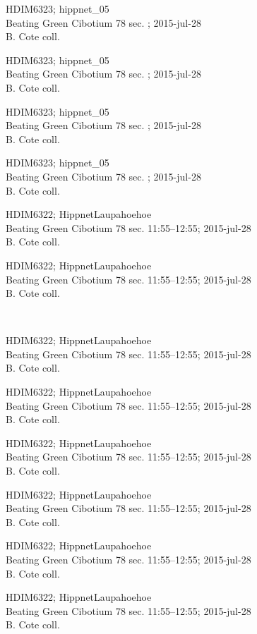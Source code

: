 \documentclass[2pt]{extarticle}
\begin{document}
\noindent
\parbox{0.16\textwidth}{\tiny \raggedright \rule[-0.3\baselineskip]{0pt}{10pt}HDIM6323; hippnet\_05\\ Beating Green Cibotium 78 sec. ; 2015-jul-28\\ B. Cote coll.}
\parbox{0.16\textwidth}{\tiny \raggedright \rule[-0.3\baselineskip]{0pt}{10pt}HDIM6323; hippnet\_05\\ Beating Green Cibotium 78 sec. ; 2015-jul-28\\ B. Cote coll.}
\parbox{0.16\textwidth}{\tiny \raggedright \rule[-0.3\baselineskip]{0pt}{10pt}HDIM6323; hippnet\_05\\ Beating Green Cibotium 78 sec. ; 2015-jul-28\\ B. Cote coll.}
\parbox{0.16\textwidth}{\tiny \raggedright \rule[-0.3\baselineskip]{0pt}{10pt}HDIM6323; hippnet\_05\\ Beating Green Cibotium 78 sec. ; 2015-jul-28\\ B. Cote coll.}
\parbox{0.16\textwidth}{\tiny \raggedright \rule[-0.3\baselineskip]{0pt}{10pt}HDIM6322; HippnetLaupahoehoe\\ Beating Green Cibotium 78 sec. 11:55--12:55; 2015-jul-28\\ B. Cote coll.}
\parbox{0.16\textwidth}{\tiny \raggedright \rule[-0.3\baselineskip]{0pt}{10pt}HDIM6322; HippnetLaupahoehoe\\ Beating Green Cibotium 78 sec. 11:55--12:55; 2015-jul-28\\ B. Cote coll.} \\ 
\vspace{0.001in} 

\noindent
\parbox{0.16\textwidth}{\tiny \raggedright \rule[-0.3\baselineskip]{0pt}{10pt}HDIM6322; HippnetLaupahoehoe\\ Beating Green Cibotium 78 sec. 11:55--12:55; 2015-jul-28\\ B. Cote coll.}
\parbox{0.16\textwidth}{\tiny \raggedright \rule[-0.3\baselineskip]{0pt}{10pt}HDIM6322; HippnetLaupahoehoe\\ Beating Green Cibotium 78 sec. 11:55--12:55; 2015-jul-28\\ B. Cote coll.}
\parbox{0.16\textwidth}{\tiny \raggedright \rule[-0.3\baselineskip]{0pt}{10pt}HDIM6322; HippnetLaupahoehoe\\ Beating Green Cibotium 78 sec. 11:55--12:55; 2015-jul-28\\ B. Cote coll.}
\parbox{0.16\textwidth}{\tiny \raggedright \rule[-0.3\baselineskip]{0pt}{10pt}HDIM6322; HippnetLaupahoehoe\\ Beating Green Cibotium 78 sec. 11:55--12:55; 2015-jul-28\\ B. Cote coll.}
\parbox{0.16\textwidth}{\tiny \raggedright \rule[-0.3\baselineskip]{0pt}{10pt}HDIM6322; HippnetLaupahoehoe\\ Beating Green Cibotium 78 sec. 11:55--12:55; 2015-jul-28\\ B. Cote coll.}
\parbox{0.16\textwidth}{\tiny \raggedright \rule[-0.3\baselineskip]{0pt}{10pt}HDIM6322; HippnetLaupahoehoe\\ Beating Green Cibotium 78 sec. 11:55--12:55; 2015-jul-28\\ B. Cote coll.} \\ 
\vspace{0.001in} 
\end{document}
